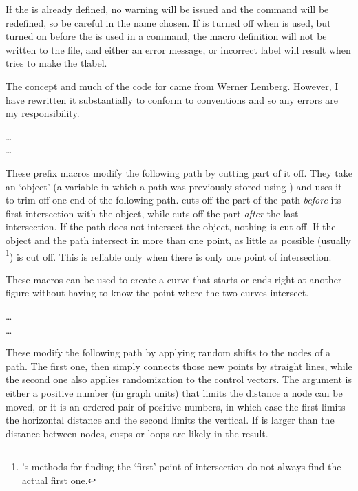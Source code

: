 \documentclass[letterpaper]{article}
\begin{document}
If the  is already defined, no warning will be issued
and the command will be redefined, so be careful in the name chosen.
If  is turned off when  is used, but
turned on before the  is used in a 
command, the macro definition will not be written to the 
file, and either an error message, or incorrect label will result
when \MP{} tries to make the tlabel.

The concept and much of the code for  came from Werner
Lemberg. However, I have rewritten it substantially to conform to \mfp{}
conventions and so any errors are my responsibility.

\begin{cd}
\dots\\
\dots\\
%
%
\end{cd}

These prefix macros modify the following path by cutting part of it off.
They take an `object' (a variable in which a path was
previously stored using ) and uses it to trim off one end of the
following path.  cuts off the part of the path
\emph{before} its first intersection with the object, while
 cuts off the part \emph{after} the last intersection.
If the path does not intersect the object, nothing is cut off. If the
object and the path intersect in more than one point, as little as
possible (usually%
    \footnote{\MF{}'s methods for finding the `first' point of
    intersection do not always find the actual first one.}) %
is cut off. This is reliable only when there is only one point of
intersection.

These macros can be used to create a curve that starts or ends
right at another figure without having to know the point where the two
curves intersect.

\begin{cd}
\dots\\
\dots
{}%
\end{cd}

These modify the following path by applying random shifts to the nodes
of a path. The first one,  then simply connects those
new points by straight lines, while the second one also applies
randomization to the control vectors. The  argument is
either a positive number (in graph units) that limits the distance a
node can be moved, or it is an ordered pair of positive numbers, in
which case the first limits the horizontal distance and the second
limits the vertical. If  is larger than the distance
between nodes, cusps or loops are likely in the result.
\end{document}
